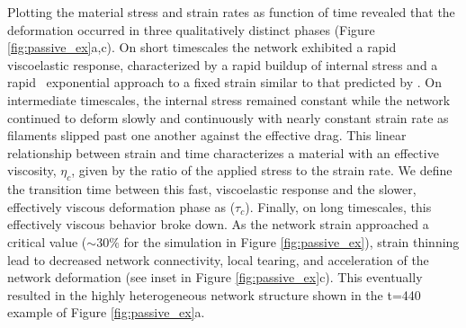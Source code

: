 \documentclass[10pt,letterpaper]{article}
\begin{document}
Plotting the material stress and strain rates as function of time revealed that the deformation occurred in three qualitatively distinct phases (Figure \ref{fig:passive_ex}a,c). On short timescales the network exhibited a rapid viscoelastic response, characterized by a rapid buildup of internal stress and a rapid ~exponential approach to a fixed strain similar to that predicted by  \cite{theo_hlm}. On intermediate timescales, the internal stress remained constant while the network continued to deform slowly and continuously with nearly constant strain rate as filaments slipped past one another against the effective drag. This linear relationship between strain and time characterizes a material with an effective viscosity, $\eta_c$, given by the ratio of the applied stress to the strain rate.  We define the transition time between this fast, viscoelastic response and the slower, effectively viscous deformation phase as ($\tau_c$).  Finally, on long timescales, this effectively viscous behavior broke down.  As the network strain approached a critical value ($\sim 30\%$ for the simulation in Figure \ref{fig:passive_ex}), strain thinning lead to decreased network connectivity, local tearing, and acceleration of the network deformation (see inset in Figure \ref{fig:passive_ex}c). This eventually resulted in the highly heterogeneous network structure shown in the t=440 example of Figure \ref{fig:passive_ex}a. 
\end{document}

